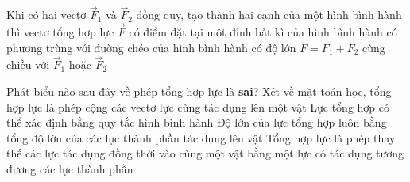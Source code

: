\begin{ex}%
Khi có hai vectơ $\vec{F}_{1}$ và $\vec{F}_{2}$ đồng quy, tạo thành hai cạnh của một hình bình hành thì vectơ tổng hợp lực $\overrightarrow{F}$
\choice
{có điểm đặt tại một đỉnh bất kì của hình bình hành}
{\True có phương trùng với đường chéo của hình bình hành}
{có độ lớn $F=F_{1}+F_{2}$}
{cùng chiều với $\overrightarrow{F}_{1}$ hoặc $\overrightarrow{F}_{2}$}
 \end{ex}

\begin{ex}%
Phát biểu nào sau đây về phép tổng hợp lực là \textbf{sai}?
\choice
{Xét về mặt toán học, tổng hợp lực là phép cộng các vectơ lực cùng tác dụng lên một vật}
{Lực tổng hợp có thể xác định bằng quy tắc hình bình hành}
{\True Độ lớn của lực tổng hợp luôn bằng tổng độ lớn của các lực thành phần tác dụng lên vật}
{Tổng hợp lực là phép thay thế các lực tác dụng đồng thời vào cùng một vật bằng một lực có tác dụng tương đương các lực thành phần}

 \end{ex}

